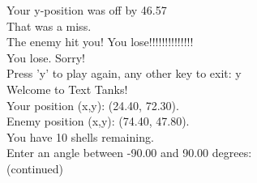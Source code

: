 \documentclass{article}
\begin{document}
{Your y-position was off by 46.57\\
That was a miss.\\
The enemy hit you!  You lose!!!!!!!!!!!!!!\\
You lose.  Sorry!\\
Press 'y' to play again, any other key to exit: y\\
Welcome to Text Tanks!\\
Your position (x,y):  (24.40, 72.30).\\
Enemy position (x,y): (74.40, 47.80).\\
You have 10 shells remaining.\\
Enter an angle between -90.00 and 90.00 degrees: \\
(continued)\\
}
\end{document}
